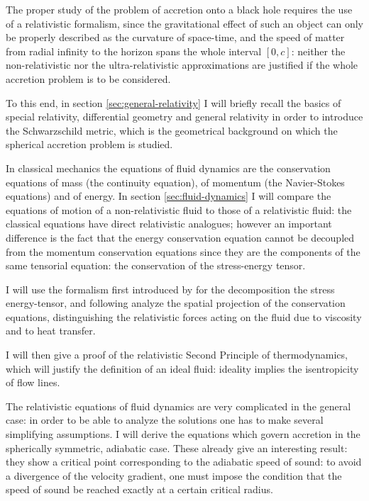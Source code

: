 \documentclass[main.tex]{subfiles}
\begin{document}
The proper study of the problem of accretion onto a black hole requires the use of a relativistic formalism, since the gravitational effect of such an object can only be properly described as the curvature of space-time, and the speed of matter from radial infinity to the horizon spans the whole interval \([0, c]\): neither the non-relativistic nor the ultra-relativistic approximations are justified if the whole accretion problem is to be considered.

To this end, in section \ref{sec:general-relativity} I will briefly recall the basics of special relativity, differential geometry and general relativity in order to introduce the Schwarzschild metric, which is the geometrical background on which the spherical accretion problem is studied.

In classical mechanics the equations of fluid dynamics are the conservation equations of mass (the continuity equation), of momentum (the Navier-Stokes equations) and of energy.
In section \ref{sec:fluid-dynamics} I will compare the equations of motion of a non-relativistic fluid to those of a relativistic fluid: the classical equations have direct relativistic analogues; however an important difference is the fact that the energy conservation equation cannot be decoupled from the momentum conservation equations since they are the components of the same tensorial equation: the conservation of the stress-energy tensor.

I will use the formalism first introduced by \textcite[]{Eckart:1940} for the decomposition the stress energy-tensor, and following \textcite[]{Taub:1978} analyze the spatial projection of the conservation equations, distinguishing the relativistic forces acting on the fluid due to viscosity and to heat transfer.

I will then give a proof of the relativistic Second Principle of thermodynamics, which will justify the definition of an ideal fluid: ideality implies the isentropicity of flow lines.

The relativistic equations of fluid dynamics are very complicated in the general case: in order to be able to analyze the solutions one has to make several simplifying assumptions.
I will derive the equations which govern accretion in the spherically symmetric, adiabatic case. These already give an interesting result: they show a critical point corresponding to the adiabatic speed of sound: to avoid a divergence of the velocity gradient, one must impose the condition that the speed of sound be reached exactly at a certain critical radius.
\end{document}
